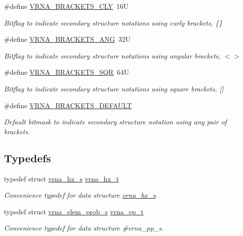 \begin{DoxyCompactItemize}
\#define \mbox{\hyperlink{group__struct__utils_gaf41be40e79cb756c4e0bb8edb4d803d2}{V\+R\+N\+A\+\_\+\+B\+R\+A\+C\+K\+E\+T\+S\+\_\+\+C\+LY}}~16U
\begin{DoxyCompactList}\small\item\em Bitflag to indicate secondary structure notations using curly brackets, {\ttfamily \{\}} \end{DoxyCompactList}\item 
\#define \mbox{\hyperlink{group__struct__utils_ga863e03f7f73f10fc9bbcbefbdda4bec8}{V\+R\+N\+A\+\_\+\+B\+R\+A\+C\+K\+E\+T\+S\+\_\+\+A\+NG}}~32U
\begin{DoxyCompactList}\small\item\em Bitflag to indicate secondary structure notations using angular brackets, {\ttfamily $<$$>$} \end{DoxyCompactList}\item 
\#define \mbox{\hyperlink{group__struct__utils_ga60525d61d7496eeea490a37f3d6bf757}{V\+R\+N\+A\+\_\+\+B\+R\+A\+C\+K\+E\+T\+S\+\_\+\+S\+QR}}~64U
\begin{DoxyCompactList}\small\item\em Bitflag to indicate secondary structure notations using square brackets, {\ttfamily \mbox{[}\mbox{]}} \end{DoxyCompactList}\item 
\#define \mbox{\hyperlink{group__struct__utils_ga559ebf76b1b289f85309f4206e99aa1a}{V\+R\+N\+A\+\_\+\+B\+R\+A\+C\+K\+E\+T\+S\+\_\+\+D\+E\+F\+A\+U\+LT}}
\begin{DoxyCompactList}\small\item\em Default bitmask to indicate secondary structure notation using any pair of brackets. \end{DoxyCompactList}\end{DoxyCompactItemize}
\subsection*{Typedefs}
\begin{DoxyCompactItemize}
\item 
typedef struct \mbox{\hyperlink{group__struct__utils_structvrna__hx__s}{vrna\+\_\+hx\+\_\+s}} \mbox{\hyperlink{group__struct__utils_ga877363f3a1703b53ecd025c6fcf897a0}{vrna\+\_\+hx\+\_\+t}}
\begin{DoxyCompactList}\small\item\em Convenience typedef for data structure \mbox{\hyperlink{group__struct__utils_structvrna__hx__s}{vrna\+\_\+hx\+\_\+s}}. \end{DoxyCompactList}\item 
typedef struct \mbox{\hyperlink{group__struct__utils_structvrna__elem__prob__s}{vrna\+\_\+elem\+\_\+prob\+\_\+s}} \mbox{\hyperlink{group__struct__utils_gab9ac98ab55ded9fb90043b024b915aca}{vrna\+\_\+ep\+\_\+t}}
\begin{DoxyCompactList}\small\item\em Convenience typedef for data structure \#vrna\+\_\+pp\+\_\+s. \end{DoxyCompactList}\end{DoxyCompactItemize}
